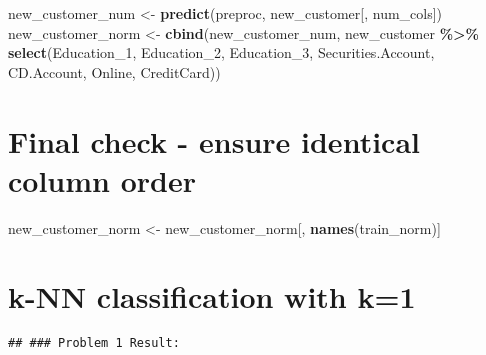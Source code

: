 \documentclass[
]{article}
\newenvironment{Shaded}{\begin{snugshade}}{\end{snugshade}}
\newcommand{\AttributeTok}[1]{\textcolor[rgb]{0.13,0.29,0.53}{#1}}
\newcommand{\DecValTok}[1]{\textcolor[rgb]{0.00,0.00,0.81}{#1}}
\newcommand{\FunctionTok}[1]{\textcolor[rgb]{0.13,0.29,0.53}{\textbf{#1}}}
\newcommand{\NormalTok}[1]{#1}
\newcommand{\OtherTok}[1]{\textcolor[rgb]{0.56,0.35,0.01}{#1}}
\newcommand{\SpecialCharTok}[1]{\textcolor[rgb]{0.81,0.36,0.00}{\textbf{#1}}}
\newcommand{\StringTok}[1]{\textcolor[rgb]{0.31,0.60,0.02}{#1}}
\begin{document}
\begin{Shaded}
\begin{Highlighting}[]
\NormalTok{new\_customer\_num }\OtherTok{\textless{}{-}} \FunctionTok{predict}\NormalTok{(preproc, new\_customer[, num\_cols])}
\NormalTok{new\_customer\_norm }\OtherTok{\textless{}{-}} \FunctionTok{cbind}\NormalTok{(new\_customer\_num,}
\NormalTok{                          new\_customer }\SpecialCharTok{\%\textgreater{}\%} \FunctionTok{select}\NormalTok{(Education\_1, Education\_2, Education\_3,}
\NormalTok{                                                Securities.Account, CD.Account, Online, CreditCard))}
\end{Highlighting}
\end{Shaded}

\section{Final check - ensure identical column
order}\label{final-check---ensure-identical-column-order}

\begin{Shaded}
\begin{Highlighting}[]
\NormalTok{new\_customer\_norm }\OtherTok{\textless{}{-}}\NormalTok{ new\_customer\_norm[, }\FunctionTok{names}\NormalTok{(train\_norm)]}
\end{Highlighting}
\end{Shaded}

\section{k-NN classification with
k=1}\label{k-nn-classification-with-k1}

\begin{Shaded}
\end{Shaded}

\begin{verbatim}
## ### Problem 1 Result:
\end{verbatim}
\end{document}
